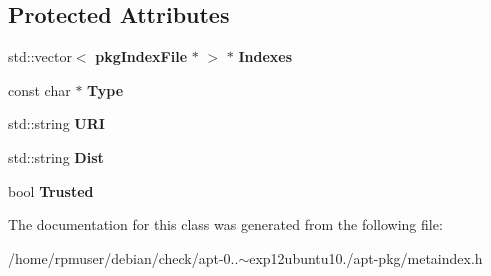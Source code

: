 \subsection*{\-Protected \-Attributes}
\begin{DoxyCompactItemize}
\item 
std\-::vector$<$ {\bf pkg\-Index\-File} $\ast$ $>$ $\ast$ {\bfseries \-Indexes}\label{classmetaIndex_ab92f49deba36733457279ebfca030de5}

\item 
const char $\ast$ {\bfseries \-Type}\label{classmetaIndex_aecb2a77585d977302e747b9dec093750}

\item 
std\-::string {\bfseries \-U\-R\-I}\label{classmetaIndex_aaf8eea5037c53d12d3f31ab9e032712c}

\item 
std\-::string {\bfseries \-Dist}\label{classmetaIndex_a33081b77174947a0be46935e0defd3c5}

\item 
bool {\bfseries \-Trusted}\label{classmetaIndex_a224b67941df4d54b46be8dd05390428f}

\end{DoxyCompactItemize}


\-The documentation for this class was generated from the following file\-:\begin{DoxyCompactItemize}
\item 
/home/rpmuser/debian/check/apt-\/0..$\sim$exp12ubuntu10./apt-\/pkg/metaindex.\-h\end{DoxyCompactItemize}
